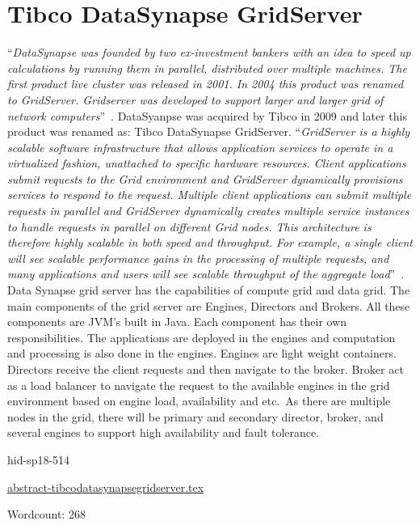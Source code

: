 \section{Tibco DataSynapse GridServer}

\color{blue}``\emph{DataSynapse was founded by two ex-investment bankers with an idea to
speed up calculations by running them in parallel, distributed over
multiple machines. The first product live cluster was released in
2001. In 2004 this product was renamed to GridServer. Gridserver was
developed to support larger and larger grid of network
computers}''\color{black}~\cite{hid-sp18-514-datasynapsewiki}. DataSyanpse was
acquired by Tibco in 2009 and later this product was renamed as: Tibco
DataSynapse GridServer\cite{hid-sp18-514-tibcodatasynapsewiki}.
\color{blue}``\emph{GridServer is a highly scalable software infrastructure that allows
application services to operate in a virtualized fashion, unattached
to specific hardware resources. Client applications submit requests to
the Grid environment and GridServer dynamically provisions services to
respond to the request. Multiple client applications can submit
multiple requests in parallel and GridServer dynamically creates
multiple service instances to handle requests in parallel on different
Grid nodes. This architecture is therefore highly scalable in both
speed and throughput. For example, a single client will see scalable
performance gains in the processing of multiple requests, and many
applications and users will see scalable throughput of the aggregate
load}''\color{black}~\cite{hid-sp18-514-tibcods}. Data Synapse grid server has the
capabilities of compute grid and data grid. The main components of the
grid server are Engines, Directors and Brokers. All these components
are JVM’s built in Java. Each component has their own
responsibilities. The applications are deployed in the engines and
computation and processing is also done in the engines. Engines are
light weight containers. Directors receive the client requests and
then navigate to the broker. Broker act as a load balancer to navigate
the request to the available engines in the grid environment based on
engine load, availability and etc.\ As there are multiple nodes in the
grid, there will be primary and secondary director, broker, and
several engines to support high availability and fault
tolerance\cite{hid-sp18-514-tibcods}.



\begin{IU}

hid-sp18-514

\href{https://github.com/cloudmesh-community/hid-sp18-514/blob/master//technology/abstract-tibcodatasynapsegridserver.tex}{abstract-tibcodatasynapsegridserver.tex}

 

Wordcount: 268

\end{IU}

